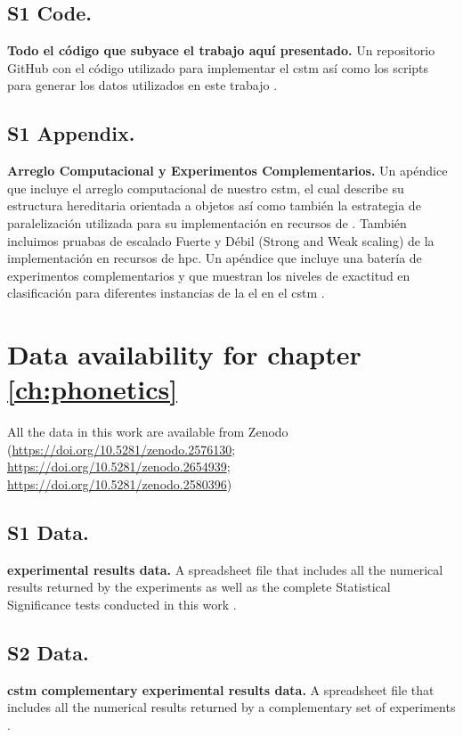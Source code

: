 {\subsection{S1 Code.}
\label{S1_Code}
{\bf Todo el código que subyace el trabajo aquí presentado.} Un repositorio GitHub con el código utilizado para implementar el \gls{cstm} así como los scripts para generar los datos utilizados en este trabajo \cite{dematties_dario_2019_2580396}.

\subsection{S1 Appendix.}
\label{S1_Appendix}
{\bf Arreglo Computacional y Experimentos Complementarios.} Un apéndice que incluye el arreglo computacional de nuestro \gls{cstm}, el cual describe su estructura hereditaria orientada a objetos así como también la estrategia de paralelización utilizada para su implementación en recursos de . También incluimos pruabas de escalado Fuerte y Débil (Strong and Weak scaling) de la implementación en recursos de \gls{hpc}. Un apéndice que incluye una batería de experimentos complementarios y que muestran los niveles de exactitud en clasificación para diferentes instancias de la \gls{el} en el \gls{cstm} \cite{dematties_dario_2019_2654939}.
}{
\section{Data availability for chapter \ref{ch:phonetics}}

All the data in this work are available from Zenodo (\url{https://doi.org/10.5281/zenodo.2576130}; \url{https://doi.org/10.5281/zenodo.2654939}; \url{https://doi.org/10.5281/zenodo.2580396})

\subsection{S1 Data.}
\label{S1_Data}
{\bf {} experimental results data.} A spreadsheet file that includes all the numerical results returned by the experiments as well as the complete Statistical Significance tests conducted in this work \cite{dematties_dario_2019_2654939}.

\subsection{S2 Data.}
\label{S2_Data}
{\bf \gls{cstm} complementary experimental results data.} A spreadsheet file that includes all the numerical results returned by a complementary set of experiments \cite{dematties_dario_2019_2654939}.

}
